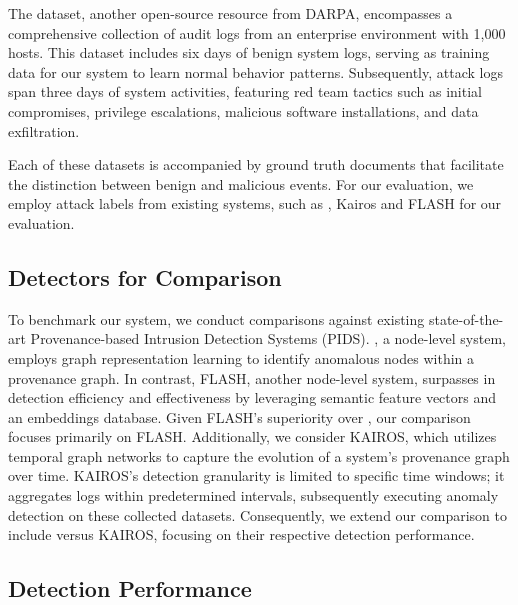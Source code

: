 The \optc dataset, another open-source resource from DARPA, encompasses a comprehensive collection of audit logs from an enterprise environment with 1,000 hosts. This dataset includes six days of benign system logs, serving as training data for our system to learn normal behavior patterns. Subsequently, attack logs span three days of system activities, featuring red team tactics such as initial compromises, privilege escalations, malicious software installations, and data exfiltration.

Each of these datasets is accompanied by ground truth documents that facilitate the distinction between benign and malicious events. For our evaluation, we employ attack labels from existing systems, such as \threatrace, Kairos and FLASH for our evaluation.


\subsection{Detectors for Comparison}


To benchmark our system, we conduct comparisons against existing state-of-the-art Provenance-based Intrusion Detection Systems (PIDS). \threatrace, a node-level system, employs graph representation learning to identify anomalous nodes within a provenance graph. In contrast, FLASH, another node-level system, surpasses \threatrace in detection efficiency and effectiveness by leveraging semantic feature vectors and an embeddings database. Given FLASH's superiority over \threatrace, our comparison focuses primarily on FLASH. Additionally, we consider KAIROS, which utilizes temporal graph networks to capture the evolution of a system's provenance graph over time. KAIROS's detection granularity is limited to specific time windows; it aggregates logs within predetermined intervals, subsequently executing anomaly detection on these collected datasets. Consequently, we extend our comparison to include \Sys versus KAIROS, focusing on their respective detection performance.

 \subsection{Detection Performance}

